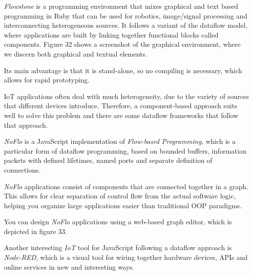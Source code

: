 \documentclass{dithesis}
\begin{document}


\textit{Flowstone}  is a programming environment that mixes graphical and text based programming in Ruby that can be used for robotics, image/signal processing and interconnecting heterogeneous sources. It follows a variant of the dataflow model, where applications are built by linking together functional blocks called components. Figure 32 shows a screenshot of the graphical environment, where we discern both graphical and textual elements.


Its main advantage is that it is stand-alone, so no compiling is necessary, which allows for rapid prototyping.


IoT applications often deal with much heterogeneity, due to the variety of sources that different devices introduce. Therefore, a component-based approach suits well to solve this problem and there are some dataflow frameworks that follow that approach.


\textit{NoFlo} is a JavaScript implementation of \textit{Flow-based Programming}\cite{fbp}, which is a particular form of dataflow programming, based on bounded buffers, information packets with defined lifetimes, named ports and separate definition of connections.

\textit{NoFlo} applications consist of components that are connected together in a graph. This allows for clear separation of control flow from the actual software logic, helping you organize large applications easier than traditional OOP paradigms. 

You can design \textit{NoFlo} applications using a web-based graph editor, which is depicted in figure 33.



Another interesting \textit{IoT} tool for JavaScript following a dataflow approach is \textit{Node-RED}\cite{node-red}, which is a visual tool for wiring together hardware devices, APIs and online services in new and interesting ways. 
\end{document}
